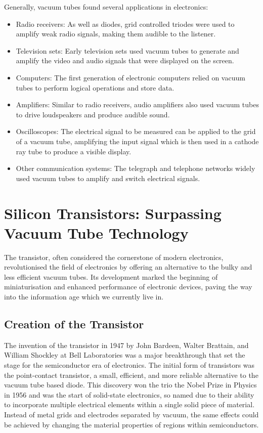 Generally, vacuum tubes found several applications in electronics:
\begin{itemize}
    \item Radio receivers: As well as diodes, grid controlled triodes were used to amplify weak radio signals, making them audible to the listener.
    \item Television sets: Early television sets used vacuum tubes to generate and amplify the video and audio signals that were displayed on the screen.
    \item Computers: The first generation of electronic computers relied on vacuum tubes to perform logical operations and store data.
    \item Amplifiers: Similar to radio receivers, audio amplifiers also used vacuum tubes to drive loudspeakers and produce audible sound.
    \item Oscilloscopes: The electrical signal to be measured can be applied to the grid of a vacuum tube, amplifying the input signal which is then used in a cathode ray tube to produce a visible display.
    \item Other communication systems: The telegraph and telephone networks widely used vacuum tubes to amplify and switch electrical signals.
\end{itemize}

\section{Silicon Transistors: Surpassing Vacuum Tube Technology}
The transistor, often considered the cornerstone of modern electronics, revolutionised the field of electronics by offering an alternative to the bulky and less efficient vacuum tubes. Its development marked the beginning of miniaturisation and enhanced performance of electronic devices, paving the way into the information age which we currently live in.

\subsection{Creation of the Transistor} 
The invention of the transistor in 1947 by John Bardeen, Walter Brattain, and William Shockley at Bell Laboratories was a major breakthrough that set the stage for the semiconductor era of electronics. The initial form of transistors was the point-contact transistor, a small, efficient, and more reliable alternative to the vacuum tube based diode. This discovery won the trio the Nobel Prize in Physics in 1956 and was the start of solid-state electronics, so named due to their ability to incorporate multiple electrical elements within a single solid piece of material. Instead of metal grids and electrodes separated by vacuum, the same effects could be achieved by changing the material properties of regions within semiconductors.

